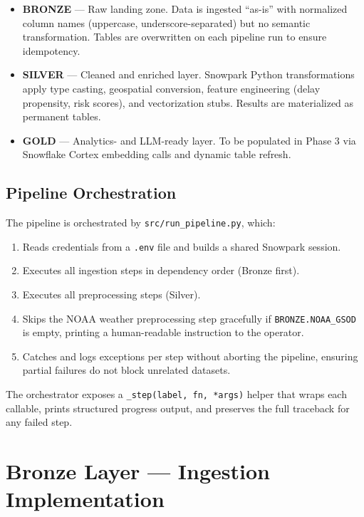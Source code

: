 \documentclass[14.5pt,letterpaper]{article}
\begin{document}
\begin{itemize}
    \item \textbf{BRONZE} --- Raw landing zone. Data is ingested ``as-is'' with normalized column names (uppercase, underscore-separated) but no semantic transformation. Tables are overwritten on each pipeline run to ensure idempotency.

    \item \textbf{SILVER} --- Cleaned and enriched layer. Snowpark Python transformations apply type casting, geospatial conversion, feature engineering (delay propensity, risk scores), and vectorization stubs. Results are materialized as permanent tables.

    \item \textbf{GOLD} --- Analytics- and LLM-ready layer. To be populated in Phase 3 via Snowflake Cortex embedding calls and dynamic table refresh.
\end{itemize}

\subsection{Pipeline Orchestration}

The pipeline is orchestrated by \texttt{src/run\_pipeline.py}, which:

\begin{enumerate}
    \item Reads credentials from a \texttt{.env} file and builds a shared Snowpark session.
    \item Executes all ingestion steps in dependency order (Bronze first).
    \item Executes all preprocessing steps (Silver).
    \item Skips the NOAA weather preprocessing step gracefully if \texttt{BRONZE.NOAA\_GSOD} is empty, printing a human-readable instruction to the operator.
    \item Catches and logs exceptions per step without aborting the pipeline, ensuring partial failures do not block unrelated datasets.
\end{enumerate}

The orchestrator exposes a \texttt{\_step(label, fn, *args)} helper that wraps each callable, prints structured progress output, and preserves the full traceback for any failed step.

\section{Bronze Layer --- Ingestion Implementation}
\end{document}
